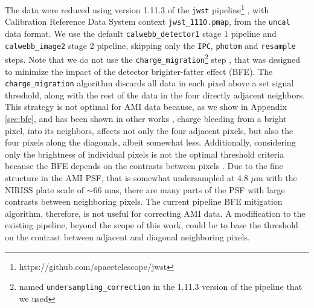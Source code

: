 \documentclass[11pt,twocolumn,twocolappendix]{aastex631}
\begin{document}
The data were reduced using version 1.11.3 of the \texttt{jwst} pipeline\footnote{https://github.com/spacetelescope/jwst} \citep{bushouse_2023_8157276}, {with Calibration Reference Data System context \texttt{jwst\_1110.pmap}}, from the \texttt{uncal} data format. We use the default \texttt{calwebb\_detector1} stage 1 pipeline and \texttt{calwebb\_image2} stage 2 pipeline, {skipping only the \texttt{IPC}, \texttt{photom} and \texttt{resample} steps}.
Note that we do not use the \texttt{charge\_migration}\footnote{named \texttt{undersampling\_correction} in the 1.11.3 version of the pipeline that we used} step \citep{2024PASP..136a4503G}, that was designed to minimize the impact of the detector brighter-fatter effect (BFE). The \texttt{charge\_migration} algorithm discards all data in each pixel above a set signal threshold, along with the rest of the data in the four directly adjacent neighbors. This strategy is not optimal for AMI data because, as we show in Appendix \ref{sec:bfe}, and has been shown in other works \citep[e.g.,][]{2023A&A...680A..96A}, charge bleeding from a bright pixel, into its neighbors, affects not only the four adjacent pixels, but also the four pixels along the diagonals, albeit somewhat less. Additionally, considering only the brightness of individual pixels is not the optimal threshold criteria because the BFE depends on the contrasts between pixels \citep[e.g.,][]{2017JInst..12C4009P}. Due to the fine structure in the AMI PSF, that is somewhat undersampled at 4.8 $\mu$m with the NIRISS plate scale of $\sim$66 mas, there are many parts of the PSF with large contrasts between neighboring pixels. The current pipeline BFE mitigation algorithm, therefore, is not useful for correcting AMI data. A modification to the existing pipeline, beyond the scope of this work, could be to base the threshold on the contrast between adjacent and diagonal neighboring pixels.
\end{document}
